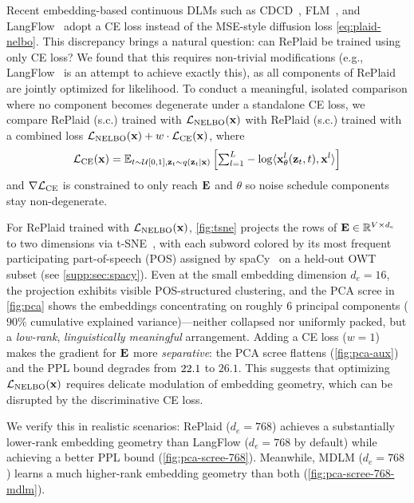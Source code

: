 \documentclass{article}
\begin{document}
Recent embedding-based continuous DLMs such as CDCD~\citep{dieleman2022continuous}, FLM~\citep{lee2026flow}, and LangFlow~\citep{chen2026langflow} adopt a CE loss instead of the MSE-style diffusion loss \cref{eq:plaid-nelbo}. This discrepancy brings a natural question: can RePlaid be trained using only CE loss? We found that this requires non-trivial modifications (e.g., LangFlow~\citep{chen2026langflow} is an attempt to achieve exactly this), as all components of RePlaid are jointly optimized for likelihood. To conduct a meaningful, isolated comparison where no component becomes degenerate under a standalone CE loss,  we compare RePlaid (s.c.) trained with $\mathcal{L}_{\mathrm{NELBO}}({\mathbf x})$ with RePlaid (s.c.) trained with a combined loss $\mathcal{L}_{\mathrm{NELBO}}({\mathbf x}) + w \cdot \mathcal{L}_{\operatorname{CE}}({\mathbf x})$, where
\begin{align}
    \mathcal{L}_{\operatorname{CE}}({\mathbf x}) = \mathbb{E}_{t\sim\mathcal{U}[0,1],{\mathbf z}_t\sim q({\mathbf z}_t|{\mathbf x})}\left[{\textstyle\sum}_{l=1}^L  -\log \langle {\mathbf x}_\theta^l({\mathbf z}_t,t), {\mathbf x}^l \rangle\right]
\end{align}
and $\nabla\mathcal{L}_{\operatorname{CE}}$ is constrained to only reach ${\mathbf E}$ and $\theta$ so noise schedule components stay non-degenerate.

For RePlaid trained with $\mathcal{L}_{\mathrm{NELBO}}({\mathbf x})$, \cref{fig:tsne} projects the rows of ${\mathbf E} \in \mathbb{R}^{V \times d_e}$ to two dimensions via t-SNE~\citep{van2008visualizing}, with each subword colored by its most frequent participating part-of-speech (POS) assigned by spaCy~\citep{honnibal2020spacy} on a held-out OWT subset (see \cref{supp:sec:spacy}). Even at the small embedding dimension $d_e = 16$, the projection exhibits visible POS-structured clustering, and the PCA scree in \cref{fig:pca} shows the embeddings concentrating on roughly $6$ principal components ($90\%$ cumulative explained variance)---neither collapsed nor uniformly packed, but a \textit{low-rank}, \textit{linguistically meaningful} arrangement. Adding a CE loss ($w=1$) makes the gradient for ${\mathbf E}$ more \textit{separative}: the PCA scree flattens (\cref{fig:pca-aux}) and the PPL bound degrades from $22.1$ to $26.1$. This suggests that optimizing $\mathcal{L}_{\mathrm{NELBO}}({\mathbf x})$ requires delicate modulation of embedding geometry, which can be disrupted by the discriminative CE loss. 

We verify this in realistic scenarios: RePlaid ($d_e=768$) achieves a substantially lower-rank embedding geometry than LangFlow ($d_e=768$ by default) while achieving a better PPL bound (\cref{fig:pca-scree-768}). Meanwhile, MDLM ($d_e=768$) learns a much higher-rank embedding geometry than both (\cref{fig:pca-scree-768-mdlm}).
\end{document}
